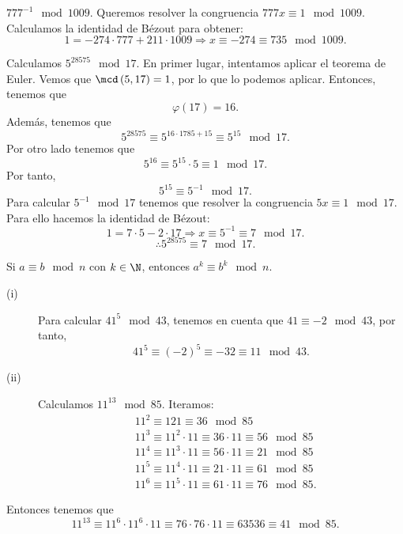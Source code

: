 \begin{eg}
\normalfont $\displaystyle 777^{-1} \mod 1009 $. Queremos resolver la congruencia $\displaystyle 777x \equiv 1 \mod 1009 $. Calculamos la identidad de Bézout para obtener:
\[ 1 = -274 \cdot 777 + 211 \cdot 1009 \Rightarrow x \equiv -274 \equiv 735 \mod 1009 .\]
\end{eg}

\begin{eg}
\normalfont Calculamos $\displaystyle 5^{28575} \mod 17 $. En primer lugar, intentamos aplicar el teorema de Euler. Vemos que $\displaystyle \mcd\left(5,17\right) = 1 $, por lo que lo podemos aplicar. Entonces, tenemos que
\[\varphi\left(17\right) = 16 .\]
Además, tenemos que 
\[ 5^{28575} \equiv 5^{16 \cdot 1785 + 15} \equiv 5^{15} \mod 17 .\]
Por otro lado tenemos que 
\[5^{16} \equiv 5^{15} \cdot 5 \equiv 1 \mod 17 .\]
Por tanto, 
\[5 ^{15 }\equiv 5^{-1} \mod 17 .\]
Para calcular $\displaystyle 5^{-1}\mod17 $ tenemos que resolver la congruencia $\displaystyle 5x \equiv 1 \mod 17 $. Para ello hacemos la identidad de Bézout:
\[1 = 7 \cdot 5 - 2 \cdot 17 \Rightarrow x \equiv 5^{-1} \equiv 7 \mod 17 .\]
\[\therefore 5^{28575} \equiv 7 \mod 17 .\]
\end{eg}

\begin{ftheorem}
\normalfont Si $\displaystyle a\equiv b \mod n $ con $\displaystyle k \in \N $, entonces $\displaystyle a^{k}\equiv b^{k} \mod n $.
\end{ftheorem}

\begin{eg}
\normalfont 
\begin{description}
\item[(i)] Para calcular $\displaystyle 41^{5} \mod 43 $, tenemos en cuenta que $\displaystyle 41 \equiv -2 \mod43 $, por tanto, 
	\[41^{5} \equiv \left(-2\right)^{5} \equiv -32 \equiv 11 \mod43 .\]
\item[(ii)] Calculamos $\displaystyle 11^{13} \mod 85 $. Iteramos:
\[
\begin{split}
& 11^{2}\equiv 121 \equiv 36 \mod 85 \\
& 11^{3} \equiv 11^{2} \cdot 11 \equiv 36 \cdot 11\equiv 56 \mod 85 \\
& 11^{4} \equiv 11^{3} \cdot 11 \equiv 56 \cdot 11 \equiv 21 \mod 85 \\
& 11^{5} \equiv 11^{4} \cdot 11 \equiv 21 \cdot 11 \equiv 61 \mod 85 \\
& 11^{6} \equiv 11^{5} \cdot 11 \equiv 61 \cdot 11 \equiv 76 \mod 85.
\end{split}
\]
\end{description}
Entonces tenemos que 
\[11^{13}\equiv11^{6} \cdot 11^{6} \cdot 11 \equiv 76 \cdot 76 \cdot 11 \equiv 63536 \equiv 41 \mod 85 .\]
\end{eg}

